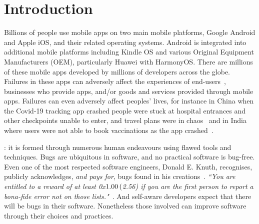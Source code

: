 \chapter{Introduction}
\label{chapter-introduction}

Billions of people use mobile apps on two main mobile platforms, Google Android and Apple iOS, and their related operating systems.  Android is integrated into additional mobile platforms including Kindle OS and various Original Equipment Manufacturers (OEM), particularly Huawei with HarmonyOS. There are millions of these mobile apps developed by millions of developers across the globe. Failures in these apps can adversely affect the experiences of end-users~\citep{bbcnews2020_nhs_covid_19_app_bluescreen_glitch}, businesses who provide apps, and/or goods and services provided through mobile apps. Failures can even adversely affect peoples' lives, for instance in China when the Covid-19 tracking app crashed people were stuck at hospital entrances and other checkpoints unable to enter, and travel plans were in chaos~\citep{scmp2021_chinas_covid_19_tracking_app_crashes} and in India where users were not able to book vaccinations as the app crashed~\citep{moneycontrolnews2021_cowin_apps_crash}.

: it is formed through numerous human endeavours using flawed tools and techniques.
Bugs are ubiquitous in software, and no practical software is bug-free. Even one of the most respected software engineers, Donald E. Knuth, recognises, publicly acknowledges, \emph{and pays for}, bugs found in his creations~\citep{knuth_trutex, wikipedia__knuth_reward_checks_2020}. \emph{``You are entitled to a reward of at least 0x$1.00 \nobreak\hspace{.16667em plus .08333em} ($2.56) if you are the first person to report a bona-fide error not on those lists."}~\citep{knuth_the_bank_of_san_serriffe}. And self-aware developers expect that there will be bugs in their software. Nonetheless those involved can improve software through their choices and practices.


